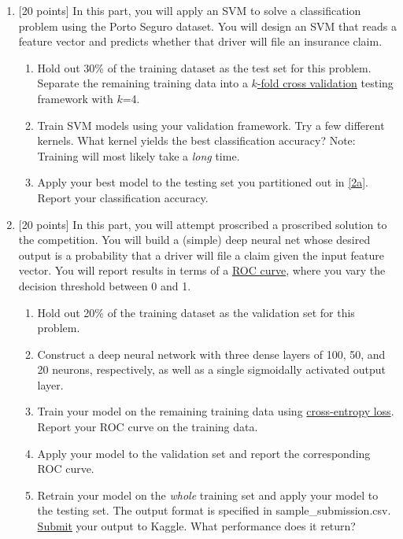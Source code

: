\documentclass[12pt]{article}
\newenvironment{problem}[2][Problem:]{\begin{trivlist}
\item[\hskip \labelsep {\bfseries #1}\hskip \labelsep {\bfseries #2.}]}{\end{trivlist}}
\begin{document}
\begin{problem}{Porto Seguro Dataset [75 points]}
\begin{enumerate}
    \item {[20 points]} 
    In this part, you will apply an SVM to solve a classification problem using the Porto Seguro dataset.
    You will design an SVM that reads a feature vector and predicts whether that driver will file an insurance claim.
    \begin{enumerate}
    	\item Hold out 30\% of the training dataset as the test set for this problem. Separate the remaining training data into a \href{https://en.wikipedia.org/wiki/Cross-validation_(statistics)#k-fold_cross-validation}{$k$-fold cross validation} testing framework with $k$=4. \label{2a}
    	\item Train SVM models using your validation framework. Try a few different kernels. What kernel yields the best classification accuracy? Note: Training will most likely take a \emph{long} time. 
	\item Apply your best model to the testing set you partitioned out in \ref{2a}. Report your classification accuracy. 
    \end{enumerate}

    \item {[20 points]} \label{3}
    In this part, you will attempt proscribed a proscribed solution to the competition. 
    You will build a (simple) deep neural net whose desired output is a probability that a driver will file a claim given the input feature vector. 
    You will report results in terms of a \href{https://en.wikipedia.org/wiki/Receiver_operating_characteristic}{ROC curve}, where you vary the decision threshold between 0 and 1. 
    \begin{enumerate}
    	\item Hold out 20\% of the training dataset as the validation set for this problem.
    	\item Construct a deep neural network with three dense layers of 100, 50, and 20 neurons, respectively, as well as a single sigmoidally activated output layer.
	\item Train your model on the remaining training data using \href{https://en.wikipedia.org/wiki/Cross_entropy}{cross-entropy loss}. Report your ROC curve on the training data.
	\item Apply your model to the validation set and report the corresponding ROC curve. 
	\item Retrain your model on the \emph{whole} training set and apply your model to the testing set. The output format is specified in sample\_submission.csv. \href{https://www.kaggle.com/c/porto-seguro-safe-driver-prediction/submit}{Submit} your output to Kaggle. What performance does it return?
    \end{enumerate}


\end{enumerate}
\end{problem}
\end{document}
